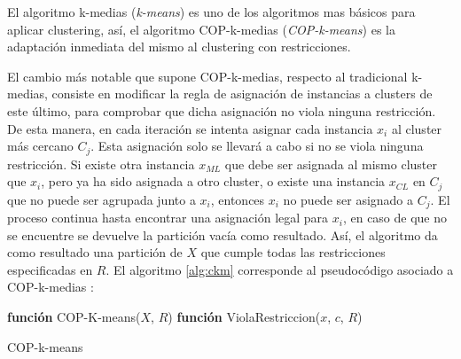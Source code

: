 El algoritmo k-medias (\textit{k-means}) es uno de los algoritmos mas básicos para aplicar clustering, así, el algoritmo COP-k-medias (\textit{COP-k-means}) es la adaptación inmediata del mismo al clustering con restricciones.

El cambio más notable que supone COP-k-medias, respecto al tradicional k-medias, consiste en modificar la regla de asignación de instancias a clusters de este último, para comprobar que dicha asignación no viola ninguna restricción. De esta manera, en cada iteración se intenta asignar cada instancia $x_i$ al cluster más cercano $C_j$. Esta asignación solo se llevará a cabo si no se viola ninguna restricción. Si existe otra instancia $x_{ML}$ que debe ser asignada al mismo cluster que $x_i$, pero ya ha sido asignada a otro cluster, o existe una instancia $x_{CL}$ en $C_j$ que no puede ser agrupada junto a $x_i$, entonces $x_i$ no puede ser asignado a $C_j$. El proceso continua hasta encontrar una asignación legal para $x_i$, en caso de que no se encuentre se devuelve la partición vacía como resultado. Así, el algoritmo da como resultado una partición de $X$ que cumple todas las restricciones especificadas en $R$. El algoritmo \ref{alg:ckm} corresponde al pseudocódigo asociado a COP-k-medias \cite{Wagstaff:2001b}:


\begin{algorithm}
	
	\BlankLine
	\BlankLine
	\textbf{función} COP-K-means($X$, $R$) 
	\BlankLine
	\BlankLine
	\textbf{función} ViolaRestriccion($x$, $c$, $R$) 
	
	\caption{COP-k-means}\label{alg:ckm}
\end{algorithm}


